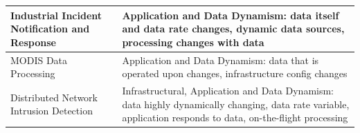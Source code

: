 \begin{table}[h]
\begin{scriptsize}
\begin{center}
\begin{tabular}{|p{4cm}|p{9.5cm}|}
		\hline
                Industrial Incident Notification and Response & Application
				and Data Dynamism: data itself and data rate changes, dynamic
				data sources, processing changes with data\\ %
		\hline
                MODIS Data Processing
		& Application and Data Dynamism: data that is operated upon changes,
		infrastructure config changes\\
		\hline
                Distributed Network Intrusion Detection &
                Infrastructural, Application and Data Dynamism: data highly
				dynamically changing, data rate variable,
				application responds to data, on-the-flight processing\\
		\hline
     \end{tabular}
    \end{center}
  \end{scriptsize}
\end{table}

